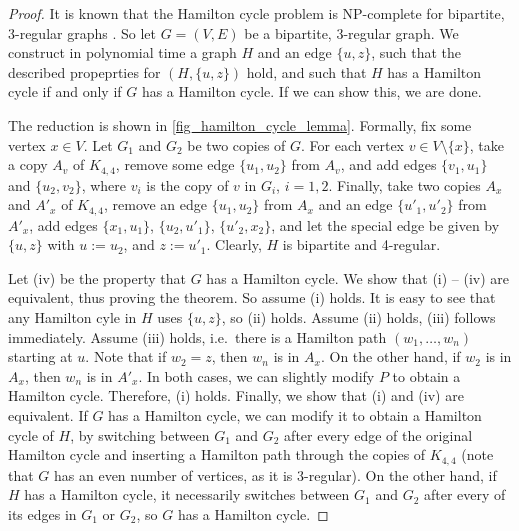 \documentclass[runningheads]{llncs}
\numberwithin{equation}{section}
\newcommand{\set}[1]{\{ #1 \}}
\begin{document}
\begin{proof}
It is known that the Hamilton cycle problem is NP-complete for bipartite, 3-regular graphs \cite{hamilton3regularBip}. So let $G = (V, E)$ be a bipartite, 3-regular graph. We construct in polynomial time a graph $H$ and an edge $\set{u,z}$, such that the described propeprties for $(H, \set{u,z})$ hold, and such that $H$ has a Hamilton cycle if and only if $G$ has a Hamilton cycle. If we can show this, we are done.

The reduction is shown in \cref{fig_hamilton_cycle_lemma}. Formally, fix some vertex $x \in V$. Let $G_1$ and $G_2$ be two copies of $G$. For each vertex $v \in V \setminus \set{x}$, take a copy $A_v$ of $K_{4,4}$, remove some edge $\set{u_1, u_2}$ from $A_v$, and add edges $\set{v_1,u_1}$ and $\set{u_2,v_2}$, where $v_i$ is the copy of $v$ in $G_i$, $i = 1,2$. Finally, take two copies $A_x$ and $A'_x$ of $K_{4,4}$, remove an edge $\set{u_1,u_2}$ from $A_x$ and an edge $\set{u'_1,u'_2}$ from $A'_x$, add edges $\set{x_1,u_1}$, $\set{u_2,u'_1}$, $\set{u'_2,x_2}$, and let the special edge be given by $\set{u, z}$ with $u := u_2$, and $z := u'_1$. Clearly, $H$ is bipartite and 4-regular.

Let (iv) be the property that $G$ has a Hamilton cycle. We show that (i) -- (iv) are equivalent, thus proving the theorem. So assume (i) holds. It is easy to see that any Hamilton cyle in $H$ uses $\set{u,z}$, so (ii) holds. Assume (ii) holds, (iii) follows immediately. Assume (iii) holds, i.e.\ there is a Hamilton path $(w_1, \dots, w_n)$ starting at $u$. Note that if $w_2 = z$, then $w_n$ is in $A_x$. On the other hand, if $w_2$ is in $A_x$, then $w_n$ is in $A'_x$. In both cases, we can slightly modify $P$ to obtain a Hamilton cycle. Therefore, (i) holds. Finally, we show that (i) and (iv) are equivalent. If $G$ has a Hamilton cycle, we can modify it to obtain a Hamilton cycle of $H$, by switching between $G_1$ and $G_2$ after every edge of the original Hamilton cycle and inserting a Hamilton path through the copies of $K_{4,4}$ (note that $G$ has an even number of vertices, as it is 3-regular). On the other hand, if $H$ has a Hamilton cycle, it necessarily switches between $G_1$ and $G_2$ after every of its edges in $G_1$ or $G_2$, so $G$ has a Hamilton cycle.
\end{proof}
\end{document}
